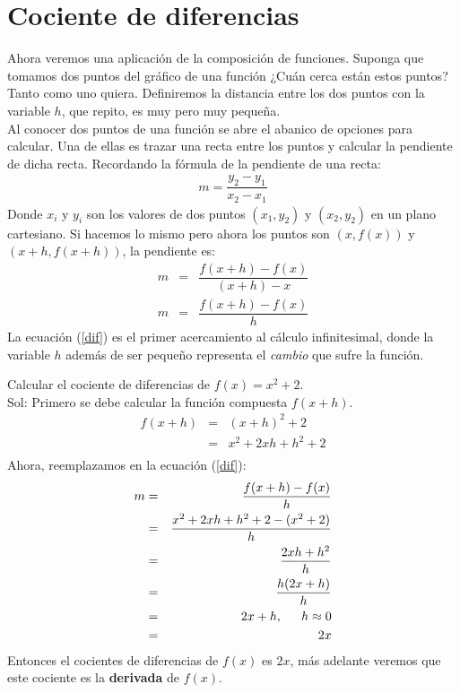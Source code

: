 \section{Cociente de diferencias}
\label{cuociente0}
Ahora veremos una aplicación de la composición de funciones. Suponga que tomamos dos puntos del gráfico de una función ¿Cuán cerca están estos puntos? Tanto como uno quiera. Definiremos la distancia entre los dos puntos con la variable $h$, que repito, es muy pero muy pequeña. \\ Al conocer dos puntos de una función se abre el abanico de opciones para calcular. Una de ellas es trazar una recta entre los puntos y calcular la pendiente de dicha recta. Recordando la fórmula de la pendiente de una recta:\\ 

\begin{eqnarray}
m = \dfrac{y_{2}-y_{1}}{x_{2}-x_{1}}
\end{eqnarray}
Donde $x_{i}$ y $y_{i}$ son los valores de dos puntos $(x_{1},y_{2})$ y $(x_{2},y_{2})$ en un plano cartesiano. Si hacemos lo mismo pero ahora los puntos son $(x,f(x))$ y $(x+h,f(x+h))$, la pendiente es:\\
\begin{eqnarray}
m&=&\dfrac{f(x+h)-f(x)}{(x+h)-x}\nonumber \\
m&=&\dfrac{f(x+h)-f(x)}{h}
\label{dif}
\end{eqnarray} 
La ecuación (\ref{dif}) es el primer acercamiento al cálculo infinitesimal, donde la variable $h$ además de ser pequeño representa el \textit{cambio} que sufre la función.

\begin{myexample}
Calcular el cociente de diferencias de $f(x)=x^{2}+2$.\\

\noindent Sol: Primero se debe calcular la función compuesta $f(x+h)$.
\begin{eqnarray*}
f(x+h)&=&(x+h)^{2}+2 \\
&=&x^{2}+2xh+h^{2}+2\\
\end{eqnarray*}
Ahora, reemplazamos en la ecuación (\ref{dif}):
\begin{eqnarray*}
m&=&\dfrac{f(x+h)-f(x)}{h}\\
&=&\dfrac{x^{2}+2xh+h^{2}+2-(x^{2}+2)}{h}\\
&=&\dfrac{2xh+h^{2}}{h}\\
&=&\dfrac{h(2x+h)}{h}\\
&=&2x+h,\hspace*{15px} h\approx 0\\
&=&2x \\
\end{eqnarray*}
Entonces el cocientes de diferencias de $f(x)$ es $2x$, más adelante veremos que este cociente es la \textbf{derivada} de $f(x)$.
\end{myexample}

